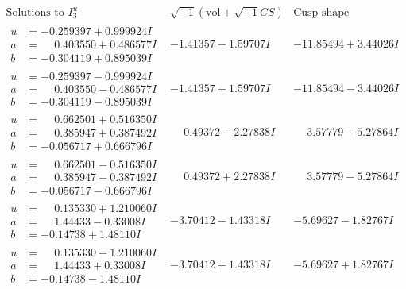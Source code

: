 \documentclass[1p]{elsarticle_modified}
\theoremstyle{definition}
\newcommand{\I}{\sqrt{-1}}
\begin{document}
$$\begin{array}{c|c|c}  
\text{Solutions to }I^u_{3}& \I (\text{vol} + \sqrt{-1}CS) & \text{Cusp shape}\\
 \hline 
\begin{aligned}
u &= -0.259397 + 0.999924 I \\
a &= \phantom{-}0.403550 + 0.486577 I \\
b &= -0.304119 + 0.895039 I\end{aligned}
 & -1.41357 - 1.59707 I & -11.85494 + 3.44026 I \\ \hline\begin{aligned}
u &= -0.259397 - 0.999924 I \\
a &= \phantom{-}0.403550 - 0.486577 I \\
b &= -0.304119 - 0.895039 I\end{aligned}
 & -1.41357 + 1.59707 I & -11.85494 - 3.44026 I \\ \hline\begin{aligned}
u &= \phantom{-}0.662501 + 0.516350 I \\
a &= \phantom{-}0.385947 + 0.387492 I \\
b &= -0.056717 + 0.666796 I\end{aligned}
 & \phantom{-}0.49372 - 2.27838 I & \phantom{-}3.57779 + 5.27864 I \\ \hline\begin{aligned}
u &= \phantom{-}0.662501 - 0.516350 I \\
a &= \phantom{-}0.385947 - 0.387492 I \\
b &= -0.056717 - 0.666796 I\end{aligned}
 & \phantom{-}0.49372 + 2.27838 I & \phantom{-}3.57779 - 5.27864 I \\ \hline\begin{aligned}
u &= \phantom{-}0.135330 + 1.210060 I \\
a &= \phantom{-}1.44433 - 0.33008 I \\
b &= -0.14738 + 1.48110 I\end{aligned}
 & -3.70412 - 1.43318 I & -5.69627 - 1.82767 I \\ \hline\begin{aligned}
u &= \phantom{-}0.135330 - 1.210060 I \\
a &= \phantom{-}1.44433 + 0.33008 I \\
b &= -0.14738 - 1.48110 I\end{aligned}
 & -3.70412 + 1.43318 I & -5.69627 + 1.82767 I \\ \hline\begin{aligned}

\end{aligned}
\end{array}$$
\end{document}
